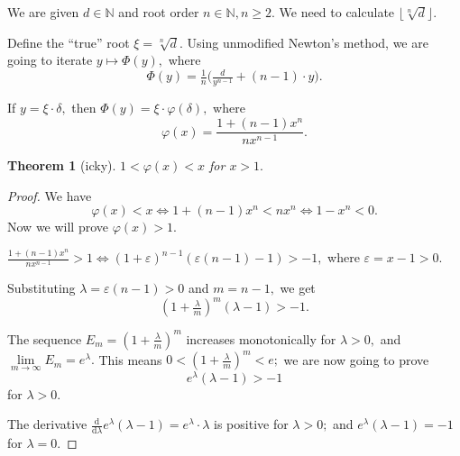 \documentclass[a4paper,12pt]{article}
\newtheorem{theorem}{Theorem}
\newcommand{\floor}[1] {\lfloor #1 \rfloor}
\begin{document}
We are given $d \in \mathbb{N}$ and root order $n \in \mathbb{N}, n \ge 2.$
We need to calculate $\floor{\sqrt[n]{d}}.$

Define the ``true'' root $\xi = \sqrt[n]{d}.$
Using unmodified Newton's method,
we are going to iterate $y \mapsto \Phi(y),$ where
$$\Phi(y) = \tfrac{1}{n} \big( \tfrac{d}{y^{n-1}} + (n-1) \cdot y \big).$$

If $y = \xi \cdot \delta,$ then $\Phi(y) = \xi \cdot \varphi(\delta),$
where $$\varphi(x) = \frac{1 + (n-1)x^n}{n x^{n-1}}.$$

\begin{theorem}[icky]
    $1 < \varphi(x) < x$ for $x > 1.$
\end{theorem}
\begin{proof}

We have
$$\varphi(x) < x \Leftrightarrow 1 + (n-1)x^n < n x^n \Leftrightarrow 1 - x^n < 0.$$
Now we will prove $\varphi(x) > 1.$

$\frac{1 + (n-1)x^n}{n x^{n-1}} > 1 \Leftrightarrow (1 + \varepsilon)^{n-1}(\varepsilon(n-1) - 1) > -1,$
where $\varepsilon = x - 1 > 0.$

Substituting $\lambda = \varepsilon(n-1) > 0$ and $m = n-1,$ we get
$$(1 + \tfrac{\lambda}{m})^m (\lambda - 1) > -1.$$

The sequence $E_m = (1 + \tfrac{\lambda}{m})^m$ increases monotonically for $\lambda > 0,$
and $\lim\limits_{m \to \infty} E_m = e^{\lambda}.$
This means $0 < (1 + \tfrac{\lambda}{m})^m < e;$ we are now going to prove
$$e^{\lambda} (\lambda - 1) > -1$$ for $\lambda > 0.$

The derivative $\frac{\mathrm{d}}{\mathrm{d} \lambda} e^{\lambda}(\lambda - 1) = e^{\lambda} \cdot \lambda$
is positive for $\lambda > 0;$ and $e^\lambda (\lambda - 1) = -1$ for $\lambda = 0.$

\end{proof}
\end{document}
